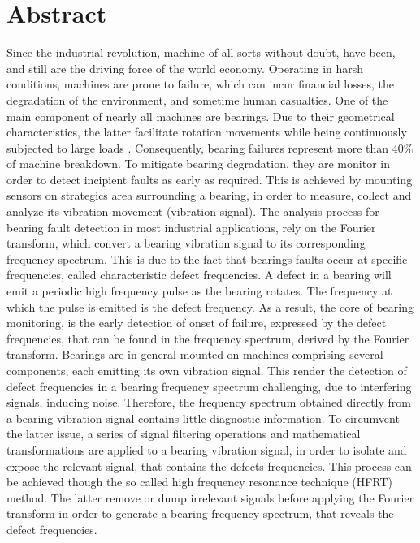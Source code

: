 \documentclass[../Main/thesis.tex]{subfiles}
\begin{document}
\null\vfill
{}
\chapter*{Abstract}
Since the industrial revolution, machine of all sorts without doubt, have been, and still are the driving force of the world economy.
Operating in harsh conditions, machines are prone to failure, which can incur financial losses, the degradation of the environment, and sometime human casualties. 
\justify
 One of the main component of nearly all machines are bearings. Due to their  geometrical characteristics, the latter facilitate rotation movements while being continuously subjected to large loads . Consequently, bearing failures represent more than 40$\%$ of machine breakdown. To mitigate bearing degradation, they are monitor in order to detect incipient faults as early as required. This is achieved by mounting sensors on strategics area   surrounding a bearing, in order to measure, collect and analyze its vibration movement (vibration signal). 
 \justify
The analysis process for bearing fault detection in most industrial applications, rely on the Fourier transform, which convert a bearing vibration signal to its corresponding frequency spectrum. This is due to the fact that bearings faults occur at specific frequencies, called characteristic defect frequencies. A defect in a bearing will emit a periodic high frequency pulse as the bearing rotates. The frequency at which the pulse is emitted is the defect frequency.
 As a result, the core of bearing monitoring, is the early detection of onset of failure, expressed by the defect frequencies, that can be found in the frequency spectrum, derived by the Fourier transform.
 \justify
 Bearings are in general mounted on machines comprising several components, each emitting its own vibration signal.
 This render the detection of defect frequencies in a bearing frequency spectrum challenging, due to interfering  signals, inducing noise. Therefore, the frequency spectrum obtained directly from a bearing vibration signal contains little diagnostic information. To circumvent the latter issue, a series of signal filtering operations and mathematical transformations are applied to a bearing vibration signal, in order to isolate and expose the relevant signal, that contains the defects frequencies. This process can be achieved though the so called high frequency resonance technique (HFRT) method. The latter remove or dump irrelevant signals before applying the Fourier transform in order to generate a  bearing frequency spectrum, that reveals the defect frequencies.
\end{document}
